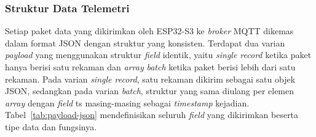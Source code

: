 \subsubsection{Struktur Data Telemetri}

Setiap paket data yang dikirimkan oleh ESP32-S3 ke \textit{broker} MQTT
dikemas dalam format JSON dengan struktur yang konsisten.
Terdapat dua varian \textit{payload} yang menggunakan struktur \textit{field}
identik, yaitu \textit{single record} ketika paket hanya berisi satu
rekaman dan \textit{array} \textit{batch} ketika paket berisi lebih dari satu
rekaman. Pada varian \textit{single record}, satu rekaman dikirim sebagai
satu objek JSON, sedangkan pada varian \textit{batch}, struktur yang sama
diulang per elemen \textit{array} dengan \textit{field} ts masing-masing sebagai
\textit{timestamp} kejadian.
Tabel~\ref{tab:payload-json} mendefinisikan seluruh \textit{field}
yang dikirimkan beserta tipe data dan fungsinya.

